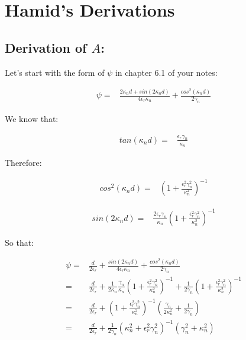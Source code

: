\documentclass[11pt, oneside]{article}   	%
\begin{document}
\section{Hamid's Derivations}

\subsection{Derivation of $A$:}

Let's start with the form of $\psi$ in chapter 6.1 of your notes:

\begin{align*}
\psi= & \frac{2\kappa_{n}d+sin\left(2\kappa_{n}d\right)}{4\epsilon_{r}\kappa_{n}}+\frac{cos^{2}\left(\kappa_{n}d\right)}{2\gamma_{n}}
\end{align*}


We know that: 

\begin{align*}
tan\left(\kappa_{n}d\right)= & \frac{\epsilon_{r}\gamma_{n}}{\kappa_{n}}
\end{align*}


Therefore:

\begin{align*}
cos^{2}\left(\kappa_{n}d\right)= & \left(1+\frac{\epsilon_{r}^{2}\gamma_{n}^{2}}{\kappa_{n}^{2}}\right)^{-1}
\end{align*}


\begin{align*}
sin\left(2\kappa_{n}d\right)= & \frac{2\epsilon_{r}\gamma_{n}}{\kappa_{n}}\left(1+\frac{\epsilon_{r}^{2}\gamma_{n}^{2}}{\kappa_{n}^{2}}\right)^{-1}
\end{align*}


So that: 

\begin{align*}
\psi= & \frac{d}{2\epsilon_{r}}+\frac{sin\left(2\kappa_{n}d\right)}{4\epsilon_{r}\kappa_{n}}+\frac{cos^{2}\left(\kappa_{n}d\right)}{2\gamma_{n}}\\
= & \frac{d}{2\epsilon_{r}}+\frac{1}{2\kappa_{n}}\frac{\gamma_{n}}{\kappa_{n}}\left(1+\frac{\epsilon_{r}^{2}\gamma_{n}^{2}}{\kappa_{n}^{2}}\right)^{-1}+\frac{1}{2\gamma_{n}}\left(1+\frac{\epsilon_{r}^{2}\gamma_{n}^{2}}{\kappa_{n}^{2}}\right)^{-1}\\
= & \frac{d}{2\epsilon_{r}}+\left(1+\frac{\epsilon_{r}^{2}\gamma_{n}^{2}}{\kappa_{n}^{2}}\right)^{-1}\left(\frac{\gamma_{n}}{2\kappa_{n}^{2}}+\frac{1}{2\gamma_{n}}\right)\\
= & \frac{d}{2\epsilon_{r}}+\frac{1}{2\gamma_{n}}\left(\kappa_{n}^{2}+\epsilon_{r}^{2}\gamma_{n}^{2}\right)^{-1}\left(\gamma_{n}^{2}+\kappa_{n}^{2}\right)
\end{align*}
\end{document}
